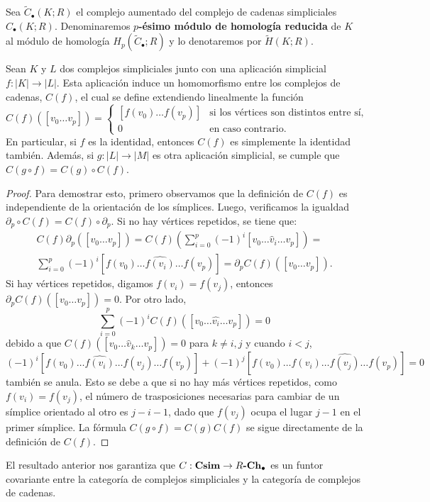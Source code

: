 \begin{definicion}
	Sea $\widetilde{C}_{\bullet}(K;R)$ el complejo aumentado del complejo de cadenas
	simpliciales $C_{\bullet}(K;R)$. Denominaremos \textbf{$p$-ésimo módulo de
		homología reducida} de $K$ al módulo de homología $H_{p}(\widetilde{C}_{\bullet}
	;R)$ y lo denotaremos por $\widetilde{H}(K;R)$.
\end{definicion}

\begin{proposicion}
	\label{prop:simpl_app_hom} Sean $K$ y $L$ dos complejos simpliciales junto con
	una aplicación simplicial $f: |K| \to |L|$. Esta aplicación induce un
	homomorfismo entre los complejos de cadenas, $C(f)$, el cual se define
	extendiendo linealmente la función
	\[
	C(f)([v_{0}\ldots v_{p}]) =
	\begin{cases}
		[f(v_{0}) \ldots f(v_{p})] & \text{si los vértices son distintos entre sí}, \\
		0                          & \text{en caso contrario}.
	\end{cases}
	\]
	En particular, si $f$ es la identidad, entonces $C(f)$ es simplemente la
	identidad también. Además, si $g: |L| \longrightarrow |M|$ es otra aplicación
	simplicial, se cumple que $C(g \circ f) = C(g) \circ C(f)$.
\end{proposicion}
\begin{proof}
	Para demostrar esto, primero observamos que la definición de $C(f)$ es
	independiente de la orientación de los símplices. Luego, verificamos la
	igualdad $\partial_{p}\circ C(f) = C(f) \circ \partial_{p}$. Si no hay vértices
	repetidos, se tiene que:
	\begin{gather*}
		C(f) \partial_{p}([v_{0}\ldots v_{p}]) = C(f) \left( \sum_{i=0}^{p}(-1)^{i}[v
		_{0}\ldots \hat{v}_{i}\ldots v_{p}] \right) = \\ \sum_{i=0}^{p}(-1)^{i}[f(v_{0}
		) \ldots \widehat{f(v_i)}\ldots f(v_{p})] = \partial_{p}C(f)([v_{0}\ldots v_{p}
		]).
	\end{gather*}
	Si hay vértices repetidos, digamos $f(v_{i}) = f(v_{j})$, entonces $\partial_{p}
	C(f)([v_{0}\ldots v_{p}]) = 0$. Por otro lado,
	\[
	\sum_{i=0}^{p}(-1)^{i}C(f)([v_{0}\ldots \hat{v_i}\ldots v_{p}]) = 0
	\]
	debido a que $C(f)([v_{0}\ldots \hat{v}_{k}\ldots v_{p}]) = 0$ para $k \neq i,j$
	y cuando $i < j$,
	\[
	(-1)^{i}[f(v_{0}) \ldots \widehat{f(v_i)}\ldots f(v_{j}) \ldots f(v_{p})] + (
	-1)^{j}[f(v_{0}) \ldots f(v_{i}) \ldots \widehat{f(v_j)}\ldots f(v_{p})] = 0
	\]
	también se anula. Esto se debe a que si no hay más vértices repetidos, como
	$f(v_{i}) = f(v_{j})$, el número de trasposiciones necesarias para cambiar de un
	símplice orientado al otro es $j-i-1$, dado que $f(v_{j})$ ocupa el lugar
	$j-1$ en el primer símplice. La fórmula $C(g \circ f)=C(g)C(f)$ se sigue directamente
	de la definición de $C(f)$.
\end{proof}
\begin{observacion}
	El resultado anterior nos garantiza que $C: \mathbf{Csim}\to R \textbf{-}\mathbf{Ch_\bullet}$
	es un funtor covariante entre la categoría de complejos simpliciales y la categoría
	de complejos de cadenas.
\end{observacion}

